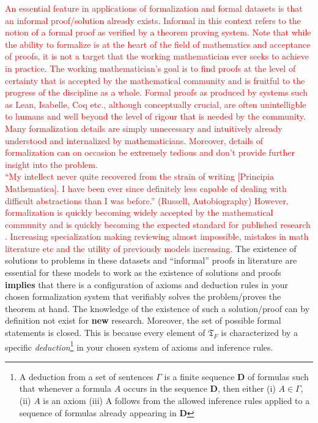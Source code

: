 \textcolor{red}{
An essential feature in applications of formalization and formal datasets is that an informal proof/solution already exists. Informal in this context refers to the notion of a formal proof as verified by a theorem proving system. Note that while the ability to formalize is at the heart of the field of mathematics and acceptance of proofs,
it is not a target that the working mathematician ever seeks to achieve in practice. The working mathematician's goal is to find proofs at the level of certainty that is accepted by the mathematical community and is fruitful to the progress of the discipline as a whole. Formal proofs as produced by systems such as Lean, Isabelle, Coq etc., although conceptually crucial, are often unintelligble to humans and well beyond the level of rigour that is needed by the community. Many formalization details are simply unnecessary and
intuitively already understood and internalized by mathematicians. Moreover, details of formalization can on occasion be extremely tedious and don't provide further insight into the problem.
\\
“My intellect never quite recovered from the strain of
writing [Principia Mathematica]. I have been ever since
definitely less capable of dealing with difficult
abstractions than I was before.” (Russell, Autobiography)
However, formalization is quickly becoming widely accepted by the mathematical community and is quickly becoming the expected standard for published research \cite{Tao, formalization_projects_to_check_shit}.
Increasing specialization making reviewing almost impossible, mistakes in math literature etc and the utility of previously models increasing.
}
The existence of solutions to problems in these datasets and ``informal'' proofs in literature are essential for these models to work as the existence of solutions and proofs \textbf{implies} that there is a configuration of axioms and deduction rules in your chosen formalization system that verifiably solves the problem/proves the theorem at hand.
The knowledge of the existence of such a solution/proof can by definition not exist for \textbf{new} research. Moreover, the set of possible formal statements is closed. This is because every element of $\mathfrak{T}_F$ is characterized by a specific \textit{deduction}\footnote[1]{A deduction from a set of sentences $\Gamma$ is a finite sequence \textbf{D} of formulas such that whenever a formula $A$ occurs in the sequence \textbf{D}, then either (i) $A\in\Gamma$, (ii) $A$ is an axiom (iii) A follows from the allowed inference rules applied to a sequence of formulas already appearing in \textbf{D}} in your chosen system of axioms and inference rules. 
